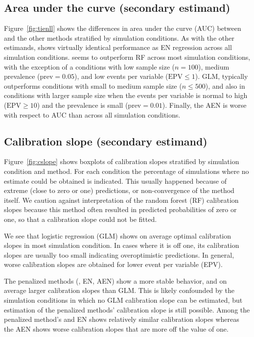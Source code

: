 \subsection{Area under the curve (secondary estimand)}
Figure~\ref{fig:tienll} shows the differences in area under the curve (AUC)
between \ainet{} and the other methods stratified by simulation conditions.
As with the other estimands, \ainet{} shows virtually identical performance
as EN regression across all simulation conditions.
\ainet{} seems to outperform RF across most simulation conditions, with the
exception of a conditions with low sample size ($n = 100$), medium prevalence
($\mbox{prev} = 0.05$), and low events per variable ($\mbox{EPV} \leq 1$).
GLM, typically outperforms \ainet{} conditions with small to medium sample size
($n \leq 500$), and also in conditions with larger sample size when the
events per variable is normal to high ($\mbox{EPV} \geq 10$) and the prevalence
is small ($\mbox{prev}  = 0.01$).
Finally, the AEN is worse with respect to AUC than \ainet{} across all
simulation conditions.

\subsection{Calibration slope (secondary estimand)}
Figure~\ref{fig:cslope} shows boxplots of calibration slopes stratified by
simulation condition and method. For each condition the percentage of
simulations where no estimate could be obtained is indicated. This usually
happened because of extreme (close to zero or one) predictions, or
non-convergence of the method itself. We caution against interpretation of the
random forest (RF) calibration slopes because this method often resulted in 
predicted probabilities of zero or one, so that a calibration slope could not 
be fitted.

We see that logistic regression (GLM) shows on average optimal calibration slopes
in most simulation condition. In cases where it is off one, its calibration
slopes are usually too small indicating overoptimistic predictions. In general,
worse calibration slopes are obtained for lower event per variable (EPV).

The penalized methods (\ainet{}, EN, AEN) show a more stable behavior, and on
average larger calibration slopes than GLM. This is likely confounded by the
simulation conditions in which no GLM calibration slope can be estimated, but
estimation of the penalized methods' calibration slope is still possible. Among
the penalized method's \ainet{} and EN shows relatively similar calibration
slopes whereas the AEN shows worse calibration slopes that are more off the
value of one.

